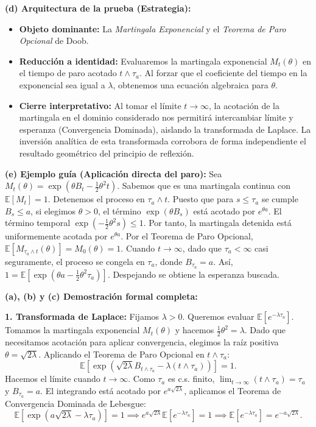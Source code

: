 \documentclass[11pt, letterpaper]{article}
\begin{document}
\begin{solucion}
    \textbf{(d) Arquitectura de la prueba (Estrategia):}
    \begin{itemize}
        \item[(i)] \textbf{Objeto dominante:} La \textit{Martingala Exponencial} y el \textit{Teorema de Paro Opcional} de Doob.
        \item[(ii)] \textbf{Reducción a identidad:} Evaluaremos la martingala exponencial $M_t(\theta)$ en el tiempo de paro acotado $t \wedge \tau_a$. Al forzar que el coeficiente del tiempo en la exponencial sea igual a $\lambda$, obtenemos una ecuación algebraica para $\theta$.
        \item[(iii)] \textbf{Cierre interpretativo:} Al tomar el límite $t \to \infty$, la acotación de la martingala en el dominio considerado nos permitirá intercambiar límite y esperanza (Convergencia Dominada), aislando la transformada de Laplace. La inversión analítica de esta transformada corrobora de forma independiente el resultado geométrico del principio de reflexión.
    \end{itemize}

    \vspace{3mm}
    \textbf{(e) Ejemplo guía (Aplicación directa del paro):}
    Sea $M_t(\theta) = \exp(\theta B_t - \frac{1}{2}\theta^2 t)$. Sabemos que es una martingala continua con $\mathbb{E}[M_t] = 1$.
    Detenemos el proceso en $\tau_a \wedge t$. Puesto que para $s \le \tau_a$ se cumple $B_s \le a$, si elegimos $\theta > 0$, el término $\exp(\theta B_{s})$ está acotado por $e^{\theta a}$. El término temporal $\exp(-\frac{1}{2}\theta^2 s) \le 1$.
    Por tanto, la martingala detenida está uniformemente acotada por $e^{\theta a}$. Por el Teorema de Paro Opcional, $\mathbb{E}[M_{\tau_a \wedge t}(\theta)] = M_0(\theta) = 1$.
    Cuando $t \to \infty$, dado que $\tau_a < \infty$ casi seguramente, el proceso se congela en $\tau_a$, donde $B_{\tau_a} = a$. Así, $1 = \mathbb{E}[\exp(\theta a - \frac{1}{2}\theta^2 \tau_a)]$. Despejando se obtiene la esperanza buscada.

    \textbf{(a), (b) y (c) Demostración formal completa:}

    \textbf{1. Transformada de Laplace:}
    Fijamos $\lambda > 0$. Queremos evaluar $\mathbb{E}[e^{-\lambda \tau_a}]$.
    Tomamos la martingala exponencial $M_t(\theta)$ y hacemos $\frac{1}{2}\theta^2 = \lambda$. Dado que necesitamos acotación para aplicar convergencia, elegimos la raíz positiva $\theta = \sqrt{2\lambda}$.
    Aplicando el Teorema de Paro Opcional en $t \wedge \tau_a$:
    \[ \mathbb{E}\left[ \exp\left( \sqrt{2\lambda} B_{t \wedge \tau_a} - \lambda (t \wedge \tau_a) \right) \right] = 1. \]
    Hacemos el límite cuando $t \to \infty$. Como $\tau_a$ es c.s. finito, $\lim_{t \to \infty} (t \wedge \tau_a) = \tau_a$ y $B_{\tau_a} = a$.
    El integrando está acotado por $e^{a\sqrt{2\lambda}}$, aplicamos el Teorema de Convergencia Dominada de Lebesgue:
    \[ \mathbb{E}\left[ \exp\left( a\sqrt{2\lambda} - \lambda \tau_a \right) \right] = 1 \implies e^{a\sqrt{2\lambda}} \mathbb{E}[e^{-\lambda \tau_a}] = 1 \implies \mathbb{E}[e^{-\lambda \tau_a}] = e^{-a\sqrt{2\lambda}}. \]


\end{solucion}
\end{document}
